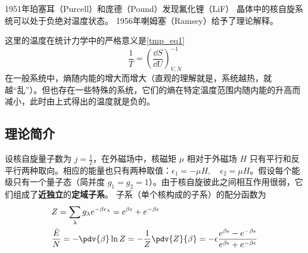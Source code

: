 
\begin{issues}
\issueDraft
\end{issues}

1951年珀塞耳（Purcell）和庞德（Pound）发现氟化锂（LiF） 晶体中的核自旋系统可以处于负绝对温度状态。
1956年喇姆塞（Ramsey）给予了理论解释。\cite{热统}

这里的温度在统计力学中的严格意义是\autoref{tmp_eq1}~
\begin{equation}
\frac{1}{T}=\left(\frac{\dd S}{\dd U}\right)_{V,N}^{-1}
\end{equation}
在一般系统中，熵随内能的增大而增大（直观的理解就是，系统越热，就越“乱”）。但也存在一些特殊的系统，它们的熵在特定温度范围内随内能的升高而减小，此时由上式得出的温度就是负的。

\subsection{理论简介}
设核自旋量子数为 $j=\frac{1}{2}$，在外磁场中，核磁矩 $\mu$ 相对于外磁场 $H$ 只有平行和反平行两种取向。相应的能量也只有两种取值：$\epsilon_1=-\mu H,\quad \epsilon_2=\mu H$。假设每个能级只有一个量子态（简并度 $g_1=g_2=1$）。由于核自旋彼此之间相互作用很弱，它们组成了\textbf{近独立}的\textbf{定域子系}。
子系（单个核构成的子系）的配分函数为
\begin{equation}
\begin{aligned}
&Z=\sum_{\lambda}g_\lambda e^{-\beta \epsilon_\lambda}=e^{\beta \epsilon } +e^{-\beta \epsilon}\\
&\frac{\bar E}{N}=-\pdv{\beta} \ln Z=-\frac{1}{Z}\pdv{Z}{\beta}=-\epsilon\frac{e^{\beta\epsilon}-e^{-\beta\epsilon}}{e^{\beta\epsilon}+e^{-\beta\epsilon}}
\end{aligned}
\end{equation}
